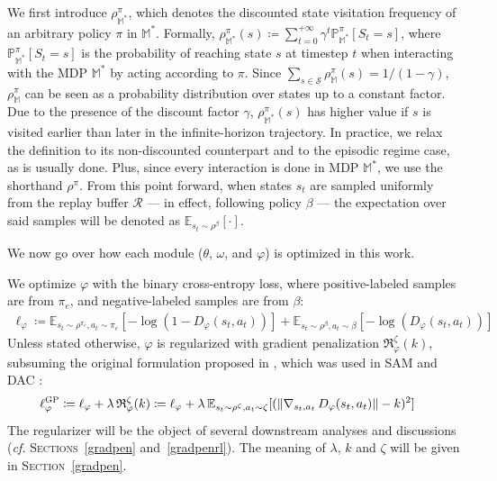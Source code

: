 We first introduce $\rho^\pi_{\mathbb{M}^*}$, which denotes
the discounted state visitation frequency
of an arbitrary policy $\pi$ in $\mathbb{M}^*$.
Formally,
$\rho^\pi_{\mathbb{M}^*} (s)
\coloneqq
\sum_{t=0}^{+\infty} \gamma^t \mathbb{P}^\pi_{\mathbb{M}^*} [S_t=s]$,
where $\mathbb{P}^\pi_{\mathbb{M}^*} [S_t=s]$ is the probability of reaching state $s$
at timestep $t$ when interacting with the MDP $\mathbb{M}^*$
by acting according to $\pi$.
Since $\sum_{s \in \mathcal{S}} \rho^\pi_\mathbb{M}(s) = 1 / (1-\gamma)$,
$\rho^\pi_\mathbb{M}$ can be seen as a probability distribution over states up to a constant factor.
Due to the presence of the discount factor $\gamma$, $\rho^\pi_{\mathbb{M}^*} (s)$ has higher value
if $s$ is visited earlier than later in the infinite-horizon trajectory.
In practice, we relax the definition to its non-discounted counterpart and to
the episodic regime case, as is usually done.
Plus, since every interaction is done in MDP $\mathbb{M}^*$, we use the shorthand $\rho^\pi$.
From this point forward, when states $s_t$ are sampled uniformly
from the replay buffer $\mathcal{R}$ --- in effect, following policy $\beta$ ---
the expectation over said samples will be denoted as $\mathbb{E}_{s_t \sim \rho^\beta} [\cdot]$.

We now go over how each module ($\theta$, $\omega$, and $\varphi$) is optimized in this work.

We optimize $\varphi$ with the binary cross-entropy loss, where positive-labeled samples are
from $\pi_e$, and negative-labeled samples are from $\beta$:
\begin{align}
\ell_\varphi \coloneqq
\mathbb{E}_{s_t \sim \rho^{\pi_e}, a_t \sim \pi_e}[-\log(1 - D_\varphi(s_t, a_t))]
+ \mathbb{E}_{s_t \sim \rho^\beta, a_t \sim \beta}[-\log(D_\varphi(s_t, a_t))]
\label{varphiloss}
\end{align}
Unless stated otherwise, $\varphi$ is regularized with
gradient penalization $\mathfrak{R}_\varphi^\zeta (k)$,
subsuming the original formulation proposed in \cite{Gulrajani2017-mr},
which was used in SAM \cite{Blonde2019-vc} and DAC \cite{Kostrikov2019-jo}:
\begin{align}
\ell_\varphi^\textsc{GP}
&\coloneqq \ell_\varphi + \lambda \, \mathfrak{R}_\varphi^\zeta (k)
\coloneqq \ell_\varphi + \lambda \,
\mathbb{E}_{s_t \sim \rho^{\zeta}, a_t \sim \zeta}
[(\lVert  \nabla _{s_t,a_t} \, D_\varphi(s_t,a_t) \rVert - k )^2]
\label{varphilossgp}
\end{align}
The regularizer will be the object of several downstream analyses and discussions
(\textit{cf.} \textsc{Sections}~\ref{gradpen} and~\ref{gradpenrl}).
The meaning of $\lambda$, $k$ and $\zeta$ will be given in \textsc{Section}~\ref{gradpen}.

